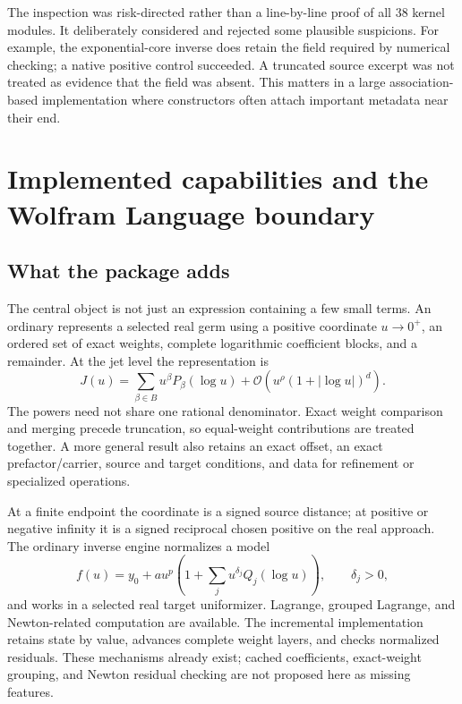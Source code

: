 \documentclass[11pt,a4paper]{article}
\newcommand{\code}[1]{\texttt{\detokenize{#1}}}
\newcommand{\OO}{\mathcal O}
\begin{document}
The inspection was risk-directed rather than a line-by-line proof of all 38 kernel modules. It deliberately considered and rejected some plausible suspicions. For example, the exponential-core inverse does retain the \code{"Power"} field required by numerical checking; a native positive control succeeded. A truncated source excerpt was not treated as evidence that the field was absent. This matters in a large association-based implementation where constructors often attach important metadata near their end.

\section{Implemented capabilities and the Wolfram Language boundary}
\label{sec:capabilities}
\subsection{What the package adds}
The central object is not just an expression containing a few small terms. An ordinary \code{GeneralizedSeries} represents a selected real germ using a positive coordinate $u\to0^+$, an ordered set of exact weights, complete logarithmic coefficient blocks, and a remainder. At the jet level the representation is
\begin{equation}\label{eq:jet}
 J(u)=\sum_{\beta\in B}u^\beta P_\beta(\log u)
      +\OO\!\left(u^\rho(1+|\log u|)^d\right).
\end{equation}
The powers need not share one rational denominator. Exact weight comparison and merging precede truncation, so equal-weight contributions are treated together. A more general result also retains an exact offset, an exact prefactor/carrier, source and target conditions, and data for refinement or specialized operations.\cite{core,ops}

At a finite endpoint the coordinate is a signed source distance; at positive or negative infinity it is a signed reciprocal chosen positive on the real approach. The ordinary inverse engine normalizes a model
\begin{equation}\label{eq:model}
 f(u)=y_0+a u^p\left(1+\sum_j u^{\delta_j}Q_j(\log u)\right),
 \qquad \delta_j>0,
\end{equation}
and works in a selected real target uniformizer. Lagrange, grouped Lagrange, and Newton-related computation are available. The incremental implementation retains state by value, advances complete weight layers, and checks normalized residuals. These mechanisms already exist; cached coefficients, exact-weight grouping, and Newton residual checking are not proposed here as missing features.\cite{core,incremental}
\end{document}
